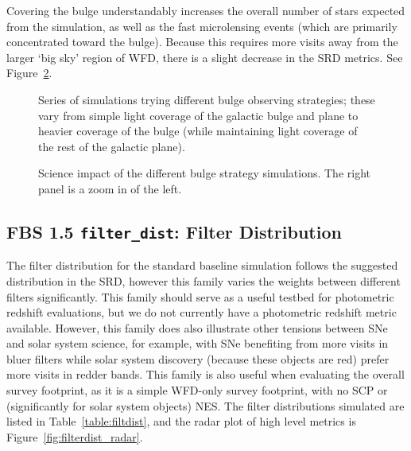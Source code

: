 Covering the bulge understandably increases the overall number of stars expected from the simulation, as well as the fast microlensing events (which are primarily concentrated toward the bulge). Because this requires more visits away from the larger `big sky' region of WFD, there is a slight decrease in the SRD metrics. See Figure~\ref{fig:bulge_radar}. 

\begin{figure}
\caption{Series of simulations trying different bulge observing strategies; these vary from simple light coverage of the galactic bulge and plane to heavier coverage of the bulge (while maintaining light coverage of the rest of the galactic plane).}\label{fig:bulge}
\end{figure}

\begin{figure}
\caption{Science impact of the different bulge strategy simulations. The right panel is a zoom in of the left.}\label{fig:bulge_radar}
\end{figure}


\subsection{FBS 1.5 {\tt filter\_dist}: Filter Distribution}\label{ss:filter_dist}

The filter distribution for the standard baseline simulation follows the suggested distribution in the SRD, however this family varies the weights between different filters significantly. This family should serve as a useful testbed for photometric redshift evaluations, but we do not currently have a photometric redshift metric available. However, this family does also illustrate other tensions between SNe and solar system science, for example, with SNe benefiting from more visits in bluer filters while solar system discovery (because these objects are red) prefer more visits in redder bands. This family is also useful when evaluating the overall survey footprint, as it is a simple WFD-only survey footprint, with no SCP or (significantly for solar system objects) NES. 
The filter distributions simulated are listed in Table~\ref{table:filtdist}, and the radar plot of high level metrics is Figure~\ref{fig:filterdist_radar}. 

